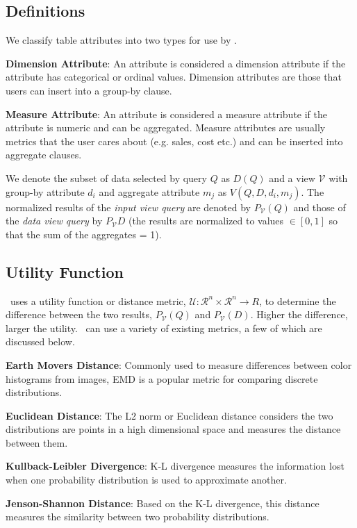 \subsection{Definitions}
\label{subsec:definitions}
We classify table attributes into two types for use by \SeeDB.
\begin{denselist}
\item {\bf Dimension Attribute}: An attribute is considered a dimension
attribute if the attribute has categorical or ordinal values. Dimension attributes are those
that users can insert into a group-by clause.
\item {\bf Measure Attribute}: An attribute is considered a measure
attribute if the attribute is numeric and can be aggregated. Measure attributes are usually
metrics that the user cares about (e.g. sales, cost etc.) and can be inserted
into aggregate clauses.
\end{denselist}

We denote the subset of data selected by query $Q$ as $D(Q)$ and a view
$\mathcal{V}$ with group-by attribute $d_i$ and aggregate attribute $m_j$ as
$V(Q, D, d_i, m_j)$. The normalized results of the {\it input view query} are
denoted by $P_\mathcal{V}(Q)$ and those of the {\it data view query} by
$P_\mathcal{V}{D}$ (the results are normalized to values $\in [0, 1]$ so that
the sum of the aggregates = 1). 

\subsection{Utility Function}
\SeeDB\ uses a utility function or distance metric, $\mathcal{U}:
\mathcal{R}^n \times \mathcal{R}^n \rightarrow {R}$, to determine the difference
between the two results, $P_\mathcal{V}(Q)$ and $P_\mathcal{V}(D)$.
Higher the difference, larger the utility. \SeeDB\ can use a variety of existing
metrics, a few of which are discussed below.

\begin{denselist}
  \item {\bf Earth Movers Distance}: Commonly used to measure differences
  between color histograms from images, EMD is a popular metric for comparing
  discrete distributions.
  \item {\bf Euclidean Distance}: The L2 norm or Euclidean distance considers
  the two distributions are points in a high dimensional space and measures the
  distance between them.
  \item {\bf Kullback-Leibler Divergence}: K-L divergence measures the
  information lost when one probability distribution is used to approximate
  another.
  \item {\bf Jenson-Shannon Distance}: Based on the K-L divergence, this
  distance measures the similarity between two probability distributions.
\end{denselist}

